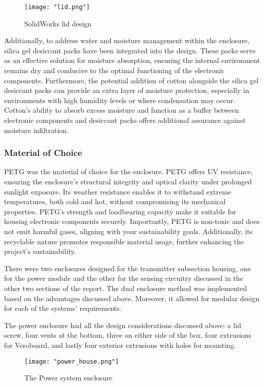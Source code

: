 \documentclass[class=report,11pt,crop=false]{standalone}
\begin{document}
\begin{figure}[H]
    \centering
    \texttt{[image: "lid.png"]}
    \caption{SolidWorks lid design}
    \label{fig:enter-label3}
\end{figure}

Additionally, to address water and moisture management within the enclosure, silica gel desiccant packs have been integrated into the design. These packs serve as an effective solution for moisture absorption, ensuring the internal environment remains dry and conducive to the optimal functioning of the electronic components. Furthermore, the potential addition of cotton alongside the silica gel desiccant packs can provide an extra layer of moisture protection, especially in environments with high humidity levels or where condensation may occur. Cotton's ability to absorb excess moisture and function as a buffer between electronic components and desiccant packs offers additional assurance against moisture infiltration.
\newline

\subsubsection{Material of Choice}
PETG was the material of choice for the enclosure. PETG offers UV resistance, ensuring the enclosure's structural integrity and optical clarity under prolonged sunlight exposure. Its weather resistance enables it to withstand extreme temperatures, both cold and hot, without compromising its mechanical properties. PETG's strength and loadbearing capacity make it suitable for housing electronic components securely. Importantly, PETG is non-toxic and does not emit harmful gases, aligning with your sustainability goals. Additionally, its recyclable nature promotes responsible material usage, further enhancing the project's sustainability. 
\newline

There were two enclosures designed for the transmitter subsection housing, one for the power module and the other for the sensing circuitry discussed in the other two sections of the report. The dual enclosure method was implemented based on the advantages discussed above. Moreover, it allowed for modular design for each of the systems’ requirements. 
\newline

The power enclosure had all the design considerations discussed above: a lid screw, four vents at the bottom, three on either side of the box, four extrusions for Veroboard, and lastly four exterior extrusions with holes for mounting.
\newline
\begin{figure}[H]
    \centering
    \texttt{[image: "power\_house.png"]}
    \caption{The Power system enclosure}
    \label{fig:enter-label3}
\end{figure}
\end{document}
